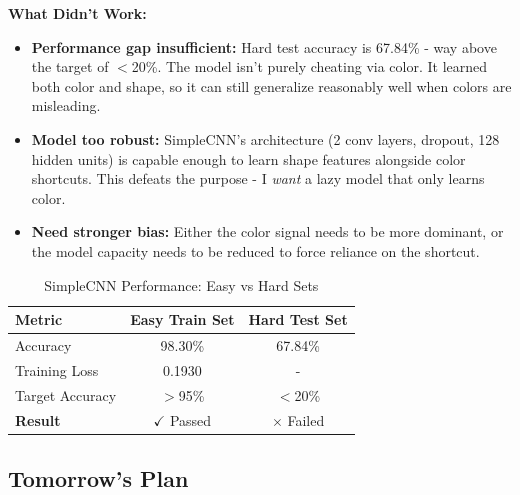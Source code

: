 \documentclass[9pt,a4paper,twocolumn,twoside]{tau-class/tau}
\begin{document}
        \textbf{What Didn't Work:}
        \begin{itemize}
            \item \textbf{Performance gap insufficient:} Hard test accuracy is 67.84\% - way above the target of $<$20\%. The model isn't purely cheating via color. It learned both color and shape, so it can still generalize reasonably well when colors are misleading.
            
            \item \textbf{Model too robust:} SimpleCNN's architecture (2 conv layers, dropout, 128 hidden units) is capable enough to learn shape features alongside color shortcuts. This defeats the purpose - I \textit{want} a lazy model that only learns color.
            
            \item \textbf{Need stronger bias:} Either the color signal needs to be more dominant, or the model capacity needs to be reduced to force reliance on the shortcut.
        \end{itemize}
        
        \begin{table}[H]
            \caption{SimpleCNN Performance: Easy vs Hard Sets}
            \label{tab:day2_results}
            \begin{tabular}{lcc}
            \toprule
            \textbf{Metric} & \textbf{Easy Train Set} & \textbf{Hard Test Set} \\
            \midrule
            Accuracy & 98.30\% & 67.84\% \\
            Training Loss & 0.1930 & - \\
            Target Accuracy & $>$95\% & $<$20\% \\
            \midrule
            \textbf{Result} & \textcolor{green!60!black}{$\checkmark$ Passed} & \textcolor{red!60!black}{$\times$ Failed} \\
            \bottomrule
            \end{tabular}
        \end{table}
        
    \subsection{Tomorrow's Plan}
    
\end{document}
